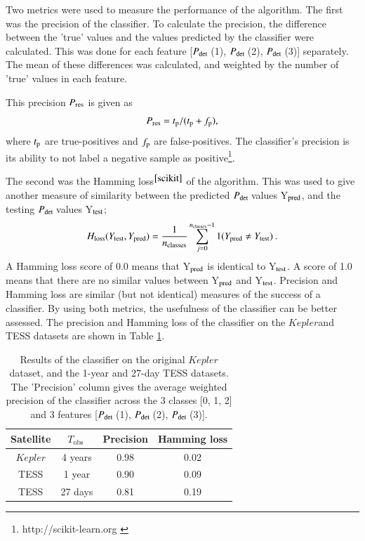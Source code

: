 \documentclass[a4paper,fleqn,usenatbib,useAMS]{mnras}
\newcommand{\kep}{\ensuremath{Kepler}\:}
\newcommand{\pdet}{\ensuremath{P_{\rm det}\:}}
\newcommand{\tobs}{\ensuremath{T_{\textrm{obs}}\:}}
\begin{document}
Two metrics were used to measure the performance of the algorithm. The first was the precision of the classifier. To calculate the precision, the difference between the 'true' values and the values predicted by the classifier were calculated. This was done for each feature [\pdet(1), \pdet(2), \pdet(3)] separately. The mean of these differences was calculated, and weighted by the number of 'true' values in each feature.

This precision $P_{\rm res}$ is given as
\begin{equation}
P_{\rm res} = t_{\rm p} / (t_{\rm p} + f_{\rm p}), 
\end{equation}
where $t_{\rm p}$ are true-positives and $f_{\rm p}$ are false-positives. The classifier's precision is its ability to not label a negative sample as positive\footnote{http://scikit-learn.org \label{scikit}}.

The second was the Hamming loss$^{\ref{scikit}}$
\citep{wegner_technique_1960} of the algorithm. This was used to give another measure of similarity between the predicted \pdet values Y$_{\rm pred}$, and the testing \pdet values Y$_{\rm test}$;
\begin{equation}
H_{\rm loss}(Y_{\rm test}, Y_{\rm pred}) = \frac{1}{n_{\rm classes}} \sum_{j=0}^{n_{\rm classes}-1} 1(Y_{\rm pred} \neq Y_{\rm test}) \: . 
\end{equation}
A Hamming loss score of 0.0 means that Y$_{\rm pred}$ is identical to Y$_{\rm test}$. A score of 1.0 means that there are no similar values between Y$_{\rm pred}$ and Y$_{\rm test}$. Precision and Hamming loss are similar (but not identical) measures of the success of a classifier. By using both metrics, the usefulness of the classifier can be better assessed. The precision and Hamming loss of the classifier on the \kep and TESS datasets are shown in Table \ref{tab: results}.
\begin{table}
\begin{center}
\begin{tabular}{ |c|c|c|c| }
Satellite & \tobs   & Precision & Hamming loss \\
\hline
\kep      & 4 years & 0.98      & 0.02         \\
TESS      & 1 year  & 0.90      & 0.09         \\
TESS      & 27 days & 0.81      & 0.19         \\
\end{tabular}
\end{center}
\caption{Results of the classifier on the original \kep dataset, and the 1-year and 27-day TESS datasets. The 'Precision' column gives the average weighted precision of the classifier across the 3 classes [0, 1, 2] and 3 features [\pdet(1), \pdet(2), \pdet(3)].}
\label{tab: results}
\end{table}
\end{document}
